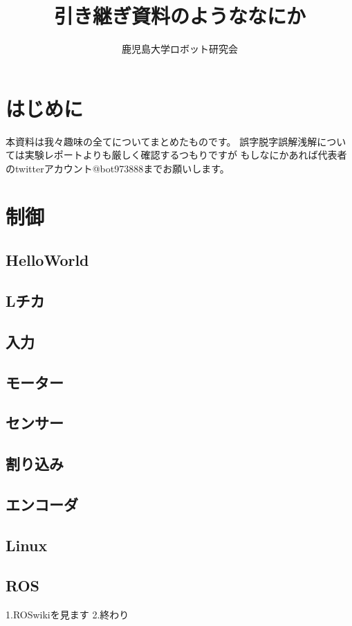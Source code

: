 \documentclass{jarticle}
\begin{document}
\title{引き継ぎ資料のようななにか}
\author{鹿児島大学ロボット研究会}

\maketitle

\tableofcontents
\clearpage

\section{はじめに}
本資料は我々趣味の全てについてまとめたものです。
誤字脱字誤解浅解については実験レポートよりも厳しく確認するつもりですが
もしなにかあれば代表者のtwitterアカウント@bot973888までお願いします。
\clearpage
\section{制御}
   \subsection{HelloWorld}
   \subsection{Lチカ}
   \subsection{入力}
   \subsection{モーター}
   \subsection{センサー}
   \subsection{割り込み}
   \subsection{エンコーダ}
   \subsection{Linux}
   \subsection{ROS}
      1.ROSwikiを見ます
      2.終わり
\clearpage
\end{document}
